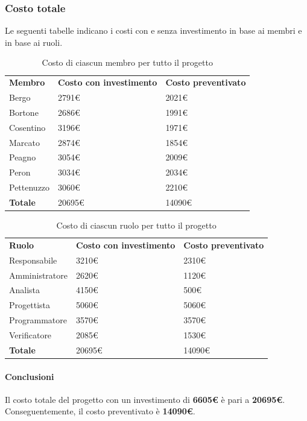 	\subsubsection{Costo totale}
		Le seguenti tabelle indicano i costi con e senza investimento in base ai membri e in base ai ruoli.
		\begin{table}[H]
			\centering
			\begin{tabular}{| l | l | l |}
				\rowcolor{LightBlue}
				\textbf{\color{white}Membro}
				& \textbf{\color{white}Costo con investimento}
				& \textbf{\color{white}Costo preventivato}\\
				
				Bergo			& 2791€ & 2021€\\
				Bortone			& 2686€ & 1991€\\
				Cosentino		& 3196€ & 1971€\\
				Marcato			& 2874€ & 1854€\\
				Peagno			& 3054€ & 2009€\\
				Peron			& 3034€ & 2034€\\
				Pettenuzzo		& 3060€ & 2210€\\ \hline
				\textbf{Totale} & 20695€ & 14090€\\ \hline
			\end{tabular}
			\caption{Costo di ciascun membro per tutto il progetto}
		\end{table}
		
		\begin{table}[H]
			\centering
			\begin{tabular}{| l | l | l |}
				\rowcolor{LightBlue}
				\textbf{\color{white}Ruolo}
				& \textbf{\color{white}Costo con investimento}
				& \textbf{\color{white}Costo preventivato}\\
				
				Responsabile 	& 3210€ & 2310€\\
				Amministratore 	& 2620€ & 1120€\\
				Analista 		& 4150€ & 500€\\			
				Progettista 	& 5060€ & 5060€\\
				Programmatore 	& 3570€ & 3570€\\
				Verificatore 	& 2085€ & 1530€\\ \hline
				\textbf{Totale} & 20695€ & 14090€\\ \hline
			\end{tabular}		
			\caption{Costo di ciascun ruolo per tutto il progetto}
		\end{table}
		
		\paragraph{Conclusioni\\}
		Il costo totale del progetto con un investimento di \textbf{6605€} è pari a \textbf{20695€}. Conseguentemente, il costo preventivato è \textbf{14090€}.